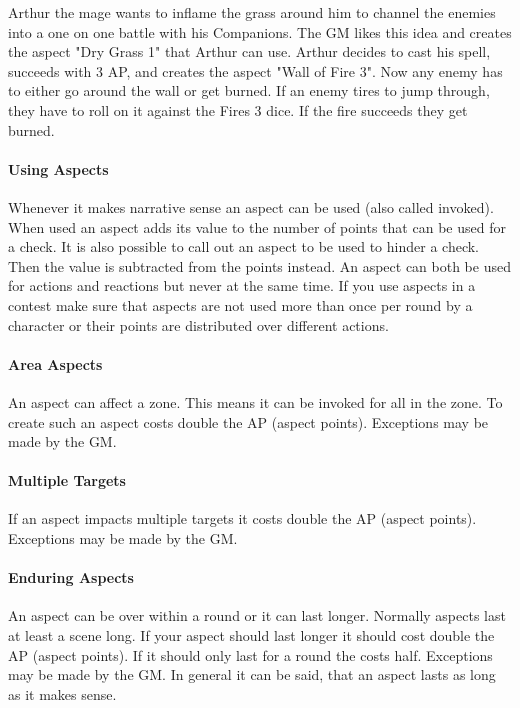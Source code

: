 \documentclass[11pt]{article}
\begin{document}
{\begin{pwexample}
Arthur the mage wants to inflame the grass around him to channel the enemies into a one on one battle with his Companions. The GM likes this idea and creates the aspect "Dry Grass 1" that Arthur can use. Arthur decides to cast his spell, succeeds with 3 AP, and creates the aspect "Wall of Fire 3". Now any enemy has to either go around the wall or get burned. If an enemy tires to jump through, they have to roll on it against the Fires 3 dice. If the fire succeeds they get burned.
\end{pwexample}

\paragraph*{Using Aspects}
\label{sec:orgd9355a3}

Whenever it makes narrative sense an aspect can be used (also called invoked). When used an aspect adds its value to the number of points that can be used for a check. It is also possible to call out an aspect to be used to hinder a check. Then the value is subtracted from the points instead. An aspect can both be used for actions and reactions but never at the same time. If you use aspects in a contest make sure that aspects are not used more than once per round by a character or their points are distributed over different actions.

\paragraph*{Area Aspects}
\label{sec:orgce898df}

An aspect can affect a zone. This means it can be invoked for all in the zone. To create such an aspect costs double the AP (aspect points). Exceptions may be made by the GM. 

\paragraph*{Multiple Targets}
\label{sec:org42799a8}
If an aspect impacts multiple targets it costs double the AP (aspect points). Exceptions may be made by the GM.

\paragraph*{Enduring Aspects}
\label{sec:org38549a6}
An aspect can be over within a round or it can last longer. Normally aspects last at least a scene long. If your aspect should last longer it should cost double the AP (aspect points). If it should only last for a round the costs half. Exceptions may be made by the GM. In general it can be said, that an aspect lasts as long as it makes sense.

}
\end{document}
